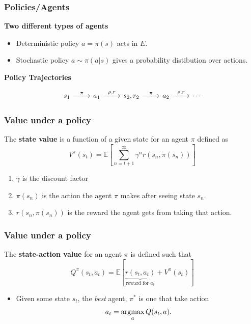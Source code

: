 \begin{frame}[fragile]
  \frametitle{Policies/Agents}
\textbf{Two different types of agents}
    \begin{itemize}
    \item Deterministic policy $a = \pi(s)$ acts in $E$. 
    \item Stochastic policy $a \sim \pi(a | s)$ gives a probability distibution over actions.
    \end{itemize}

\textbf{Policy Trajectories}
    
    \begin{equation*}
      \begin{tikzcd}
          s_1 \arrow{r}{\pi} & a_1 \arrow{r}{\rho, r} & s_2, r_2 \arrow{r}{\pi}& a_2  \arrow{r}{\rho, r} & \cdots
         \end{tikzcd}   
    \end{equation*}
\end{frame}



\begin{frame}
\frametitle{Value under a policy}
  The \textbf{state value} is a function of a given state for an agent $\pi$ defined as 
  \begin{equation*}
    V^\pi(s_t) = \mathbb{E}\left[\sum_{n={t+1}}^\infty \gamma^n r(s_n, \pi(s_n))\right]
  \end{equation*} 
  \begin{enumerate}
    \item $\gamma$ is the discount factor
    \item $\pi(s_n)$ is the action the agent $\pi$ makes after seeing state $s_n$.
    \item $r(s_n, \pi(s_n))$ is the reward the agent gets from taking that action.
  \end{enumerate}
\end{frame}

\begin{frame}
\frametitle{Value under a policy}
  The \textbf{state-action value} for an agent $\pi$ is defined such that
  \begin{equation*}
    Q^\pi(s_t, a_t) = \mathbb{E}\left[\underbrace{r(s_t, a_t)}_{\text{reward for } a_t} + V^\pi(s_t)\right]
  \end{equation*}
  \begin{itemize}
    \item Given some state $s_t$, the \emph{best} agent, $\pi^*$ is one that take action 
  \begin{equation*}
    a_t = \mathop{\mathrm{argmax}}_a Q(s_t, a).   
  \end{equation*}
  \end{itemize}
\end{frame}

